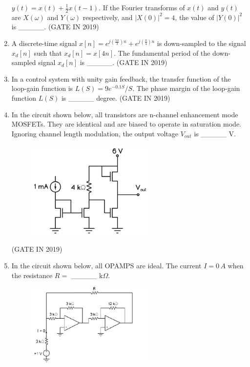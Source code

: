 \documentclass[journal]{IEEEtran}
\begin{document}
\begin{enumerate}
$ y(t) = x(t) + \frac{1}{2}x(t - 1). $
If the Fourier transforms of $x(t)$ and $y(t)$ are $X(\omega)$ and $Y(\omega)$ respectively, and $|X(0)|^2 = 4$, the value of $|Y(0)|^2$ is \_\_\_\_\_.
\hfill(GATE IN 2019)
\item A discrete-time signal $x[n] = e^{j(\frac{5\pi}{3})n} + e^{j(\frac{\pi}{4})n}$ is down-sampled to the signal $x_d[n]$ such that $x_d[n] = x[4n]$. The fundamental period of the down-sampled signal $x_d[n]$ is \_\_\_\_\_.
\hfill(GATE IN 2019)
\item In a control system with unity gain feedback, the transfer function of the loop-gain function is 
$ L(S) = 9e^{-0.1S}/S. $
The phase margin of the loop-gain function $L(S)$ is \_\_\_\_\_ degree.
\hfill(GATE IN 2019)
\item In the circuit shown below, all transistors are n-channel enhancement mode MOSFETs. They are identical and are biased to operate in saturation mode. Ignoring channel length modulation, the output voltage $V_{out}$ is \_\_\_\_\_ V.
\begin{figure}[H]
    \centering
    \includegraphics[width=0.6\textwidth]{19.png}
    \caption{}
    \label{fig:fig19}
\end{figure}
\hfill(GATE IN 2019)
\item In the circuit shown below, all OPAMPS are ideal. The current $I = 0 \, A$ when the resistance $R = $ \_\_\_\_\_ k$\Omega$.
\begin{figure}[H]
    \centering
    \includegraphics[width=0.6\textwidth]{20.png}

\end{figure}
\end{enumerate}
\end{document}
